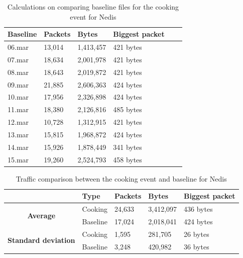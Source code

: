 \begin{table}[H]
    \centering
    \caption{Calculations on comparing baseline files for the cooking event for Nedis}
    \begin{tabular}{|l|l|l|l|l|l|}
    \hline
        \textbf{Baseline} & \textbf{Packets} & \textbf{Bytes} & \textbf{Biggest packet} \\ \hline
        06.mar & 13,014 & 1,413,457 & 421 bytes \\ \hline
        07.mar & 18,634 & 2,001,978 & 421 bytes \\ \hline
        08.mar & 18,643 & 2,019,872 & 421 bytes \\ \hline
        09.mar & 21,885 & 2,606,363 & 424 bytes \\ \hline
        10.mar & 17,956 & 2,326,898 & 424 bytes \\ \hline
        11.mar & 18,380 & 2,126,816 & 485 bytes \\ \hline
        12.mar & 10,728 & 1,312,915 & 421 bytes \\ \hline
        13.mar & 15,815 & 1,968,872 & 424 bytes \\ \hline
        14.mar & 15,926 & 1,878,449 & 341 bytes \\ \hline
        15.mar & 19,260 & 2,524,793 & 458 bytes \\ \hline
    \end{tabular}
    \label{tab:NedisBaselineCookingCalculations}
\end{table}

\begin{table}[H]
    \centering
    \caption{Traffic comparison between the cooking event and baseline for Nedis}
    \begin{tabular}{c|l|l|l|l|}
        \cline{2-5}
        \multicolumn{1}{l|}{}                                              & \textbf{Type} & \textbf{Packets} & \textbf{Bytes} & \textbf{Biggest packet} \\ \hline
        \multicolumn{1}{|c|}{\multirow{2}{*}{\textbf{Average}}}            & Cooking         & 24,633             & 3,412,097       & 436 bytes               \\ \cline{2-5} 
        \multicolumn{1}{|c|}{}                                             & Baseline      & 17,024             & 2,018,041       & 424 bytes                \\ \hline
        \multicolumn{1}{|c|}{\multirow{2}{*}{\textbf{Standard deviation}}} & Cooking         & 1,595              & 281,705         & 26 bytes                 \\ \cline{2-5} 
        \multicolumn{1}{|c|}{}                                             & Baseline      & 3,248              & 420,982         & 36 bytes               \\ \hline          
    \end{tabular}
    \label{tab:NedisComparingBaselineAndCookingCalculations}
\end{table}

